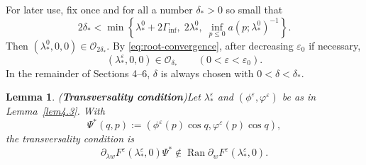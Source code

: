 \documentclass[11pt,reqno]{amsart}
\numberwithin{equation}{section}
\newtheorem{lemma}[theorem]{Lemma}
\theoremstyle{definition}
\theoremstyle{remark}
\begin{document}
For later use, fix once and for all a number $\delta_*>0$ so small
that
\[
 2\delta_*<\min\left\{
 \lambda_*^0+2\Gamma_{\inf},\;
 2\lambda_*^0,\;
 \inf_{p\leq0}a(p;\lambda_*^0)^{-1}
 \right\}.
\]
Then $(\lambda_*^0,0,0)\in\mathcal O_{2\delta_*}$.  By
\eqref{eq:root-convergence}, after decreasing $\varepsilon_0$ if
necessary,
\[
 (\lambda_*^\varepsilon,0,0)\in\mathcal O_{\delta_*}
 \qquad(0<\varepsilon<\varepsilon_0).
\]
In the remainder of Sections 4--6, $\delta$ is always chosen with
$0<\delta<\delta_*$.

\begin{lemma}({\bf Transversality condition})\label{lem4.4}
Let $\lambda_*^{\varepsilon}$ and
$(\phi^{\varepsilon},\varphi^{\varepsilon})$ be as in
Lemma~\ref{lem4.3}.  With
\[
 \Psi^*(q,p)
 :=(\phi^{\varepsilon}(p)\cos q,
    \varphi^{\varepsilon}(p)\cos q),
\]
the transversality condition is
\[
 \partial_{\lambda w}F^{\varepsilon}
 (\lambda_*^{\varepsilon},0)\Psi^*
 \notin
 \operatorname{Ran}\partial_wF^{\varepsilon}
 (\lambda_*^{\varepsilon},0).
\]
\end{lemma}
\end{document}
